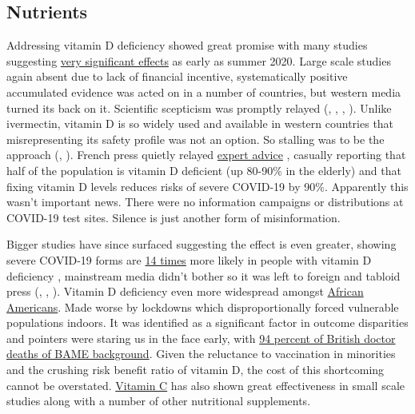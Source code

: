 \documentclass[11pt,a4paper,notitlepage]{report}
\begin{document}
\subsection*{Nutrients}

Addressing vitamin D deficiency showed great promise with many studies suggesting \href{https://c19vitamind.com/}{very significant effects} as early as summer 2020. Large scale studies again absent due to lack of financial incentive, systematically positive accumulated evidence was acted on in a number of countries, but western media turned its back on it. Scientific scepticism was promptly relayed (\cite{guardian29062020}, \cite{guardian29032021}, \cite{bbc17112020}, \cite{quechoisir29012021}). Unlike ivermectin, vitamin D is so widely used and available in western countries that misrepresenting its safety profile was not an option. So stalling was to be the approach (\cite{bbc05042021}, \cite{guardian29022021}). French press quietly relayed \href{https://www.franceinter.fr/covid-19-73-experts-lancent-un-appel-pour-qu-on-donne-de-la-vitamine-d-a-la-population-francaise}{expert advice} \cite{franceinter19012021}, casually reporting that half of the population is vitamin D deficient (up 80-90\% in the elderly) and that fixing vitamin D levels reduces risks of severe COVID-19 by 90\%. Apparently this wasn't important news. There were no information campaigns or distributions at COVID-19 test sites. Silence is just another form of misinformation.

Bigger studies have since surfaced suggesting the effect is even greater, showing severe COVID-19 forms are \href{https://journals.plos.org/plosone/article?id=10.1371/journal.pone.0263069}{14 times} more likely in people with vitamin D deficiency \cite{10.1371/journal.pone.0263069}, mainstream media didn't bother so it was left to foreign and tabloid press (\cite{timesofisrael03022022}, \cite{dailymail08022022}, \cite{hindustantimes14022022}). Vitamin D deficiency even more widespread amongst \href{https://www.everydayhealth.com/vitamin-d/does-vitamin-d-deficiency-pose-a-special-risk-for-black-people}{African Americans}. Made worse by lockdowns which disproportionally forced vulnerable populations indoors. It was identified as a significant factor in outcome disparities \cite{Ames2021-sf} and pointers were staring us in the face early, with \href{https://twitter.com/TheBMA/status/1271768163630428160?s=20}{94 percent of British doctor deaths of BAME background}. Given the reluctance to vaccination in minorities and the crushing risk benefit ratio of vitamin D, the cost of this shortcoming cannot be overstated. \href{https://nutritionj.biomedcentral.com/articles/10.1186/s12937-021-00727-z}{Vitamin C} has also shown great effectiveness in small scale studies \cite{irriguible2021} along with a number of other nutritional supplements.
\end{document}
